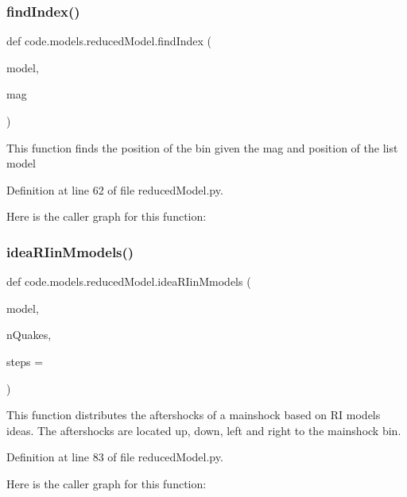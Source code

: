 \subsubsection{\texorpdfstring{find\+Index()}{findIndex()}}
{\footnotesize\ttfamily def code.\+models.\+reduced\+Model.\+find\+Index (\begin{DoxyParamCaption}\item[{}]{model,  }\item[{}]{mag }\end{DoxyParamCaption})}

\begin{DoxyVerb}This function finds the position of the bin given the mag and position of the list model
\end{DoxyVerb}
 

Definition at line 62 of file reduced\+Model.\+py.

Here is the caller graph for this function\+:
\mbox{\label{namespacecode_1_1models_1_1reduced_model_a1dbc918061bcefc4e9955af387532b5f}} 
\subsubsection{\texorpdfstring{idea\+R\+Iin\+Mmodels()}{ideaRIinMmodels()}}
{\footnotesize\ttfamily def code.\+models.\+reduced\+Model.\+idea\+R\+Iin\+Mmodels (\begin{DoxyParamCaption}\item[{}]{model,  }\item[{}]{n\+Quakes,  }\item[{}]{steps = {} }\end{DoxyParamCaption})}

\begin{DoxyVerb}This function distributes the aftershocks of a mainshock based on RI models ideas.
The aftershocks are located up, down, left and right to the mainshock bin.
\end{DoxyVerb}
 

Definition at line 83 of file reduced\+Model.\+py.

Here is the caller graph for this function\+:
\mbox{\label{namespacecode_1_1models_1_1reduced_model_a15d2e8698086c4f6d8a6502cfd0f00c8}} 
